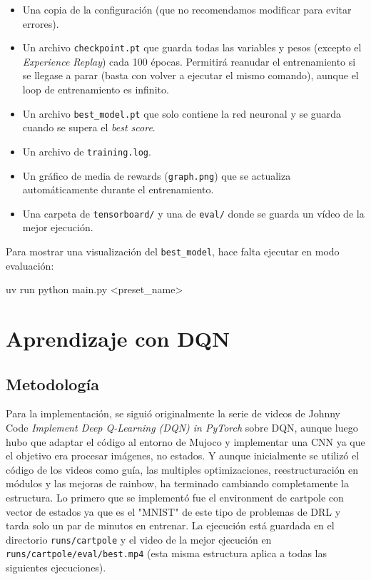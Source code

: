 \documentclass[onecolumn]{cwpreport} %
\begin{document}
\begin{itemize}
    \item Una copia de la configuración (que no recomendamos modificar para evitar errores).
    \item Un archivo \texttt{checkpoint.pt} que guarda todas las variables y pesos (excepto el \textit{Experience Replay}) cada 100 épocas. Permitirá reanudar el entrenamiento si se llegase a parar (basta con volver a ejecutar el mismo comando), aunque el loop de entrenamiento es infinito.
    \item Un archivo \texttt{best\_model.pt} que solo contiene la red neuronal y se guarda cuando se supera el \textit{best score}.
    \item Un archivo de \texttt{training.log}.
    \item Un gráfico de media de rewards (\texttt{graph.png}) que se actualiza automáticamente durante el entrenamiento.
    \item Una carpeta de \texttt{tensorboard/} y una de \texttt{eval/} donde se guarda un vídeo de la mejor ejecución.
\end{itemize}

Para mostrar una visualización del \texttt{best\_model}, hace falta ejecutar en modo evaluación:

\begin{mycode}[language=bash]
uv run python main.py <preset_name>
\end{mycode}

\section{Aprendizaje con DQN}

\subsection{Metodología}
Para la implementación, se siguió originalmente la serie de videos de Johnny Code \textit{Implement Deep Q-Learning (DQN) in PyTorch} sobre DQN, aunque luego hubo que adaptar el código al entorno de Mujoco y implementar una CNN ya que el objetivo era procesar imágenes, no estados. Y aunque inicialmente se utilizó el código de los videos como guía, las multiples optimizaciones, reestructuración en módulos y las mejoras de rainbow, ha terminado cambiando completamente la estructura. Lo primero que se implementó fue el environment de cartpole con vector de estados ya que es el "MNIST" de este tipo de problemas de DRL y tarda solo un par de minutos en entrenar. La ejecución está guardada en el directorio \texttt{runs/cartpole} y el video de la mejor ejecución en \texttt{runs/cartpole/eval/best.mp4} (esta misma estructura  aplica a todas las siguientes ejecuciones).
\end{document}
